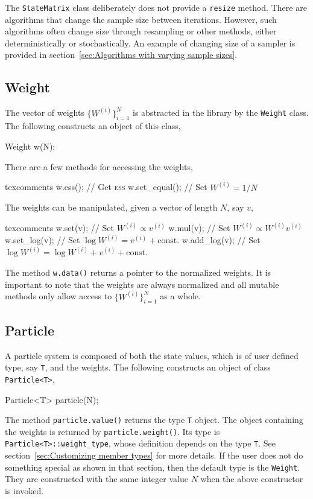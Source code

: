 The \verb|StateMatrix| class deliberately does not provide a \verb|resize|
method. There are algorithms that change the sample size between iterations.
However, such algorithms often change size through resampling or other methods,
either deterministically or stochastically. An example of changing size of a
sampler is provided in section~\ref{sec:Algorithms with varying sample sizes}.

\subsection{Weight}
\label{sub:Weight}

The vector of weights $\{W^{(i)}\}_{i=1}^N$ is abstracted in the library by the
\verb|Weight| class. The following constructs an object of this class,
\begin{cppcode}
  Weight w(N);
\end{cppcode}
There are a few methods for accessing the weights,
\begin{cppcode*}{texcomments}
  w.ess();          // Get {\normalfont\textsc{ess}}
  w.set_equal();    // Set $W^{(i)} = 1/N$
\end{cppcode*}
The weights can be manipulated, given a vector of length $N$, say $v$,
\begin{cppcode*}{texcomments}
  w.set(v);         // Set $W^{(i)} \propto v^{(i)}$
  w.mul(v);         // Set $W^{(i)} \propto W^{(i)} v^{(i)}$
  w.set_log(v);     // Set $\log W^{(i)} = v^{(i)} + \text{const.}$
  w.add_log(v);     // Set $\log W^{(i)} = \log W^{(i)} + v^{(i)} + \text{const.}$
\end{cppcode*}
The method \verb|w.data()| returns a pointer to the normalized weights. It is
important to note that the weights are always normalized and all mutable
methods only allow access to $\{W^{(i)}\}_{i=1}^N$ as a whole.

\subsection{Particle}
\label{sub:Particle}

A particle system is composed of both the state values, which is of user
defined type, say \verb|T|, and the weights. The following constructs an object
of class \verb|Particle<T>|,
\begin{cppcode}
  Particle<T> particle(N);
\end{cppcode}
The method \verb|particle.value()| returns the type \verb|T| object. The object
containing the weights is returned by \verb|particle.weight()|. Its type is
\verb|Particle<T>::weight_type|, whose definition depends on the type \verb|T|.
See section~\ref{sec:Customizing member types} for more details. If the user
does not do something special as shown in that section, then the default type
is the \verb|Weight|. They are constructed with the same integer value $N$ when
the above constructor is invoked.

